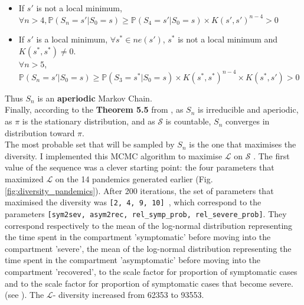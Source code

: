 \begin{itemize}
    \item If $s'$ is not a local minimum, \\
     $\forall n >4, \mathbb{P}(S_{n} = s' \vert S_0 = s) \geqslant \mathbb{P}(S_{4} = s' \vert S_0 = s) \times K(s', s')^{n-4} > 0 $ \\
    \item If $s'$ is a local minimum,  $\forall s^* \in ne(s')$, $s^*$ is not a local minimum and $K(s^*, s^*) \neq 0$. \\
    $\forall n>5$, $\mathbb{P}(S_n = s' \vert S_0 = s)   \geqslant \mathbb{P}(S_3=s^* \vert S_0 = s) \times K(s^*, s^*)^{n-4} \times K(s^*, s') >0 $\\
    
\end{itemize}

Thus $S_n$ is an \textbf{aperiodic} Markov Chain.\\


Finally, according to the \textbf{Theorem 5.5 } from \cite*{bodineau2015modelisation}, as $S_n$ is irreducible and aperiodic, as $\pi$ is the stationary distribution, and as $\mathcal{S}$ is countable, $S_n$ converges in distribution toward $\pi$.\\


The most probable set that will be sampled by $S_n$ is the one that maximises the diversity.
I implemented this MCMC algorithm to maximise $\mathcal{L}$ on $\mathcal{S}$ . 
The first value of the sequence was a clever starting point: the four parameters that maximized $\mathcal{L}$ on the 14 pandemics generated earlier (Fig.\ref{fig:diversity_pandemics}).  
After 200 iterations, the set of parameters that maximised the diversity was \texttt{[2, 4, 9, 10] }, which correspond to the parameters \texttt{[sym2sev, asym2rec, rel\_symp\_prob, rel\_severe\_prob]}. 
They correspond respectively to the mean of the log-normal distribution representing the time spent in the compartment 'symptomatic' before moving into the compartment 'severe', the mean of the log-normal distribution representing the time spent in the compartment 'asymptomatic' before moving into the compartment 'recovered', to the scale factor for proportion of symptomatic cases and to the scale factor for proportion of symptomatic cases that become severe. (see \cite{kerr2021covasim}). 
The $\mathcal{L}$- diversity increased from 62353 to 93553. \\

